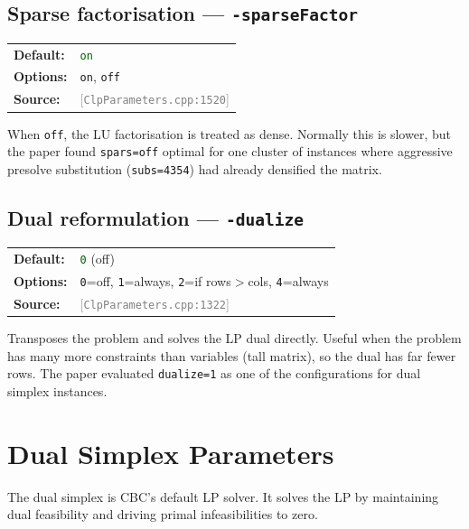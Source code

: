 \documentclass[11pt,a4paper]{article}
\newcommand{\param}[1]{\texttt{\textbf{#1}}}
\newcommand{\val}[1]{\texttt{#1}}
\newcommand{\src}[1]{\textcolor{gray}{\small[\texttt{#1}]}}
\newcommand{\default}[1]{\textcolor{darkgreen}{\texttt{#1}}}
\begin{document}
\subsection{Sparse factorisation --- \param{-sparseFactor}}

\begin{tabular}{@{}ll@{}}
  \textbf{Default:} & \default{on} \\
  \textbf{Options:} & \val{on}, \val{off} \\
  \textbf{Source:}  & \src{ClpParameters.cpp:1520}
\end{tabular}

\medskip
When \val{off}, the LU factorisation is treated as dense. Normally this is slower,
but the paper found \val{spars=off} optimal for one cluster of instances where
aggressive presolve substitution (\val{subs=4354}) had already densified the matrix.

\subsection{Dual reformulation --- \param{-dualize}}

\begin{tabular}{@{}ll@{}}
  \textbf{Default:} & \default{0} (off) \\
  \textbf{Options:} & \val{0}=off, \val{1}=always, \val{2}=if rows$>$cols, \val{4}=always \\
  \textbf{Source:}  & \src{ClpParameters.cpp:1322}
\end{tabular}

\medskip
Transposes the problem and solves the LP dual directly. Useful when the problem has
many more constraints than variables (tall matrix), so the dual has far fewer rows.
The paper evaluated \val{dualize=1} as one of the configurations for dual simplex instances.

\section{Dual Simplex Parameters}
\label{sec:dual}

The dual simplex is CBC's default LP solver. It solves the LP by maintaining dual
feasibility and driving primal infeasibilities to zero.
\end{document}
